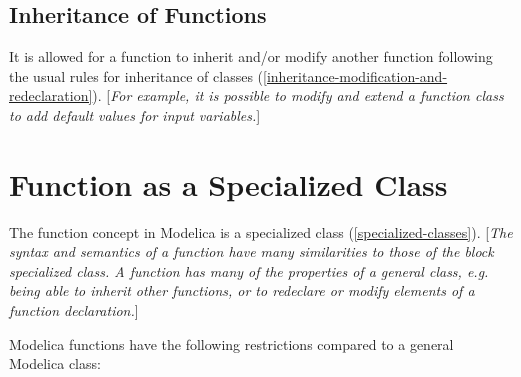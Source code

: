 \documentclass[10pt,a4paper]{report}
\def\doublelabel#1{\label{#1}}
\begin{document}
\subsection{Inheritance of Functions}\doublelabel{inheritance-of-functions}

It is allowed for a function to inherit and/or modify another function
following the usual rules for inheritance of classes (\ref{inheritance-modification-and-redeclaration}).
{[}\emph{For example, it is possible to modify and extend a function
class to add default values for input variables.}{]}

\section{Function as a Specialized Class}\doublelabel{function-as-a-specialized-class}

The function concept in Modelica is a specialized class (\ref{specialized-classes}).
{[}\emph{The syntax and semantics of a function have many similarities
to those of the block specialized class. A function has many of the
properties of a general class, e.g. being able to inherit other
functions, or to redeclare or modify elements of a function
declaration.}{]}

Modelica functions have the following restrictions compared to a general
Modelica class:
\end{document}
